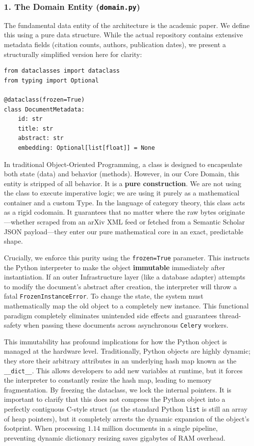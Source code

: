 
\subsubsection*{1. The Domain Entity (\texttt{domain.py})}

The fundamental data entity of the architecture is the academic paper. We define this using a pure data structure. While the actual repository contains extensive metadata fields (citation counts, authors, publication dates), we present a structurally simplified version here for clarity:

\begin{lstlisting}[caption={Simplified Domain Entity}]
from dataclasses import dataclass
from typing import Optional

@dataclass(frozen=True)
class DocumentMetadata:
    id: str
    title: str
    abstract: str
    embedding: Optional[list[float]] = None
\end{lstlisting}

In traditional Object-Oriented Programming, a class is designed to encapsulate both state (data) and behavior (methods). However, in our Core Domain, this entity is stripped of all behavior. It is a \textbf{pure construction}. We are not using the class to execute imperative logic; we are using it purely as a mathematical container and a custom Type. In the language of category theory, this class acts as a rigid codomain. It guarantees that no matter where the raw bytes originate---whether scraped from an arXiv XML feed or fetched from a Semantic Scholar JSON payload---they enter our pure mathematical core in an exact, predictable shape.

Crucially, we enforce this purity using the \texttt{frozen=True} parameter. This instructs the Python interpreter to make the object \textbf{immutable} immediately after instantiation. If an outer Infrastructure layer (like a database adapter) attempts to modify the document's abstract after creation, the interpreter will throw a fatal \texttt{FrozenInstanceError}. To change the state, the system must mathematically map the old object to a completely new instance. This functional paradigm completely eliminates unintended side effects and guarantees thread-safety when passing these documents across asynchronous \texttt{Celery} workers.

This immutability has profound implications for how the Python object is managed at the hardware level. Traditionally, Python objects are highly dynamic; they store their arbitrary attributes in an underlying hash map known as the \texttt{\_\_dict\_\_}. This allows developers to add new variables at runtime, but it forces the interpreter to constantly resize the hash map, leading to memory fragmentation. By freezing the dataclass, we lock the internal pointers. It is important to clarify that this does not compress the Python object into a perfectly contiguous C-style struct (as the standard Python \texttt{list} is still an array of heap pointers), but it completely arrests the dynamic expansion of the object's footprint. When processing $1.14$ million documents in a single pipeline, preventing dynamic dictionary resizing saves gigabytes of RAM overhead.

